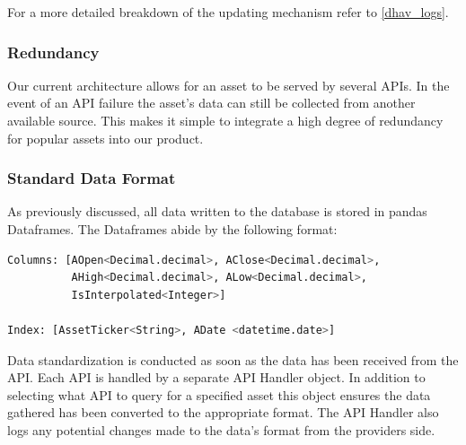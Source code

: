 \documentclass[main.tex]{subfiles}
\begin{document}
For a more detailed breakdown of the updating mechanism refer to \ref{dhav_logs}.


\subsubsection{Redundancy}

Our current architecture allows for an asset to be served by several APIs. In the event of an API failure the asset's data can still be collected from another available source. This makes it simple to integrate a high degree of redundancy for popular assets into our product. 


\subsubsection{Standard Data Format}
As previously discussed, all data written to the database is stored in pandas Dataframes. The Dataframes abide by the following format:

\begin{lstlisting}[language=Python, caption= Pandas Data Frame Format]
Columns: [AOpen<Decimal.decimal>, AClose<Decimal.decimal>,
          AHigh<Decimal.decimal>, ALow<Decimal.decimal>,
          IsInterpolated<Integer>] 
          
Index: [AssetTicker<String>, ADate <datetime.date>]
\end{lstlisting}

Data standardization is conducted as soon as the data has been received from the API. Each API is handled by a separate API Handler object. In addition to selecting what API to query for a specified asset this object ensures the data gathered has been converted to the appropriate format. The API Handler also logs any potential changes made to the data's format from the providers side.
\end{document}
